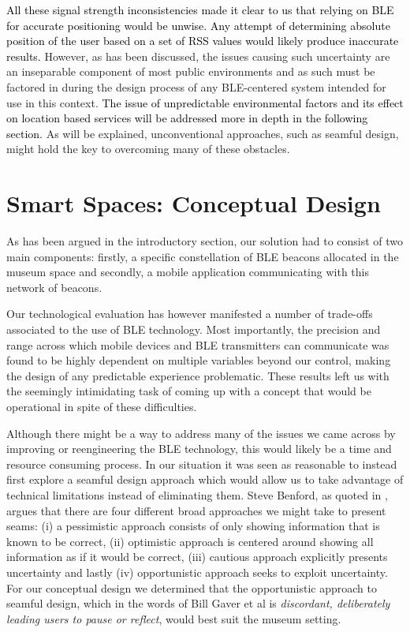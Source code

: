 \documentclass[prodmode,acmtomm]{acmsmall}
\begin{document}
\textcolor{black}{All these signal strength inconsistencies made it clear to us that relying on BLE for accurate positioning would be unwise. Any attempt of determining absolute position of the user based on a set of RSS values would likely produce inaccurate results.} However, as has been discussed, the issues causing such uncertainty are an inseparable component of most public environments and as such must be factored in during the design process of any BLE-centered system intended for use in this context.\textcolor{black}{ The issue of unpredictable environmental factors and its effect on location based services will be addressed more in depth in the following section.} As will be explained, unconventional approaches, such as seamful design, might hold the key to overcoming many of these obstacles. 

\section{Smart Spaces: Conceptual Design}
As has been argued in the introductory section, our solution had to consist of two main components: firstly, a specific constellation of BLE beacons allocated in the museum space and secondly, a mobile application communicating with this network of beacons. 

Our technological evaluation has however manifested a number of trade-offs associated to the use of BLE technology. Most importantly, the precision and range across which mobile devices and BLE transmitters can communicate was found to be highly dependent on multiple variables beyond our control, making the design of any predictable experience problematic. These results left us with the seemingly intimidating task of coming up with a concept that would be operational in spite of these difficulties.

Although there might be a way to address many of the issues we came across by improving or reengineering the BLE technology, this would likely be a time and resource consuming process. In our situation it was seen as reasonable to instead first explore a seamful design approach which would allow us to take advantage of technical limitations instead of eliminating them. Steve Benford, as quoted in  \cite{chalmers2003}, argues that there are four different broad approaches we might take to present seams: (i) a pessimistic approach consists of only showing information that is known to be correct, (ii) optimistic approach is centered around showing all information as if it would be correct, (iii) cautious approach explicitly presents uncertainty and lastly (iv) opportunistic approach seeks to exploit uncertainty. For our conceptual design we determined that the opportunistic approach to seamful design, which in the words of Bill Gaver et al \cite{gaver1992} is \textit{discordant, deliberately leading users to pause or reflect}, would best suit the museum setting. 
\end{document}
